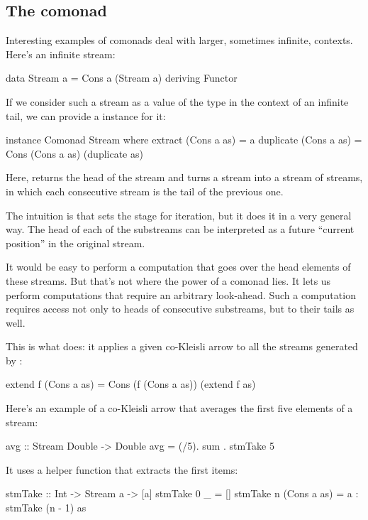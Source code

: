 \documentclass[DaoFP]{subfiles}
\begin{document}
\subsection{The  comonad}
Interesting examples of comonads deal with larger, sometimes infinite, contexts. Here's an infinite stream:
\begin{haskell}
data Stream a = Cons a (Stream a)
    deriving Functor
\end{haskell}

If we consider such a stream as a value of the type  in the context of an infinite tail, we can provide a  instance for it:
\begin{haskell}
instance Comonad Stream where
  extract (Cons a as) = a
  duplicate (Cons a as) = Cons (Cons a as) (duplicate as)
\end{haskell}
Here,  returns the head of the stream and  turns a stream into a stream of streams, in which each consecutive stream is the tail of the previous one. 

The intuition is that  sets the stage for iteration, but it does it in a very general way. The head of each of the substreams can be interpreted as a future ``current position'' in the original stream. 

It would be easy to perform a computation that goes over the head elements of these streams. But that's not where the power of a comonad lies. It lets us perform computations that require an arbitrary look-ahead.  Such a computation requires access not only to heads of consecutive substreams, but to their tails as well.

This is what  does: it applies a given co-Kleisli arrow  to all the streams generated by :
\begin{haskell}
  extend f (Cons a as) = Cons (f (Cons a as)) (extend f as)
\end{haskell}

Here's an example of a co-Kleisli arrow that averages the first five elements of a stream:
\begin{haskell}
avg :: Stream Double -> Double
avg  = (/5). sum . stmTake 5
\end{haskell}
It uses a helper function that extracts the first  items:
\begin{haskell}
stmTake :: Int -> Stream a -> [a]
stmTake 0 _ = []
stmTake n (Cons a as) = a : stmTake (n - 1) as
\end{haskell}
\end{document}
